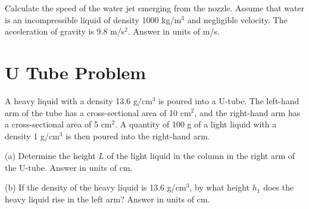\documentclass[../physics12.tex]{subfiles}
\begin{document}
Calculate the speed of the water jet emerging from the nozzle. Assume that water is an incompressible liquid of density 1000 kg/m$^3$ and negligible velocity. The acceleration of gravity is 9.8 m/s$^2$. Answer in units of m/s.
\section{U Tube Problem}
A heavy liquid with a density 13.6 g/cm$^3$ is poured into a U-tube. The left-hand arm of the tube has a cross-sectional area of 10 cm$^2$, and the right-hand arm has a cross-sectional area 
of 5 cm$^2$. A quantity of 100 g of a light liquid with a density 1 g/cm$^3$ is then poured into the right-hand arm.

(a) Determine the height $L$ of the light liquid in the column in the right arm of the U-tube. Answer in units of cm.

(b) If the density of the heavy liquid is 13.6 g/cm$^3$, by what height $h_1$ does the heavy liquid rise in the left arm? Answer in units of cm.
\end{document}

